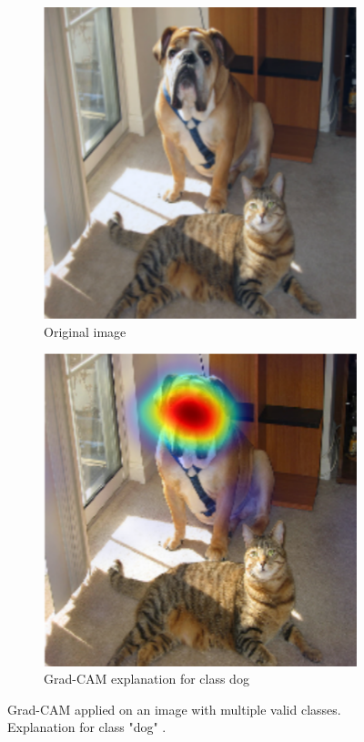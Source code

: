 \begin{figure}[H]
    \centering
    \begin{subfigure}{.5\textwidth}
        \centering
        \includegraphics[width=0.7\linewidth]{chapters/02_methods/images/grad-cam-original.png}
        \caption{Original image}
    \end{subfigure}\hfill%
    \begin{subfigure}{.5\textwidth}
        \centering
        \includegraphics[width=0.7\linewidth]{chapters/02_methods/images/grad-cam-dog.png}
        \caption{Grad-CAM explanation for class dog}
    \end{subfigure}
    \caption{Grad-CAM applied on an image with multiple valid classes. Explanation for class "dog" \cite{selvaraju2017grad}.}
    \label{grad_cam_dog}
\end{figure}

